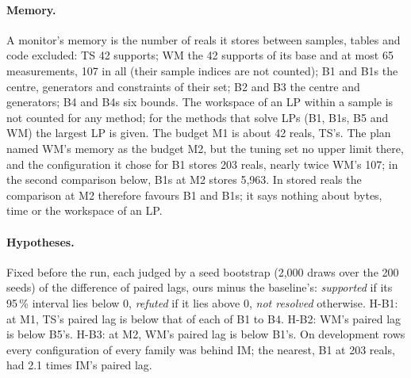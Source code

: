 \documentclass[11pt,a4paper]{article}
\begin{document}
\paragraph{Memory.} A monitor's memory is the number of reals it stores between samples, tables and code excluded:
TS 42 supports; WM the 42 supports of its base and at most 65 measurements, 107 in all (their sample indices are not
counted); B1 and B1s the centre, generators and constraints of their set; B2 and B3 the centre and generators; B4 and
B4s six bounds. The workspace of an LP within a sample is not counted for any method; for the methods that solve LPs
(B1, B1s, B5 and WM) the largest LP is given. The budget M1 is about 42 reals, TS's. The plan named WM's memory as the budget M2, but the
tuning set no upper limit there, and the configuration it chose for B1 stores 203 reals, nearly twice WM's 107; in the
second comparison below, B1s at M2 stores 5,963. In stored reals the comparison at M2 therefore favours B1 and B1s; it
says nothing about bytes, time or the workspace of an LP.

\paragraph{Hypotheses.} Fixed before the run, each judged by a seed bootstrap (2,000 draws over the 200 seeds) of the
difference of paired lags, ours minus the baseline's: \emph{supported} if its 95\,\% interval lies below 0,
\emph{refuted} if it lies above 0, \emph{not resolved} otherwise. H-B1: at M1, TS's paired lag is below that of each
of B1 to B4. H-B2: WM's paired lag is below B5's. H-B3: at M2, WM's paired lag is below B1's. On development rows
every configuration of every family was behind IM; the nearest, B1 at 203 reals, had 2.1 times IM's paired lag.
\end{document}
